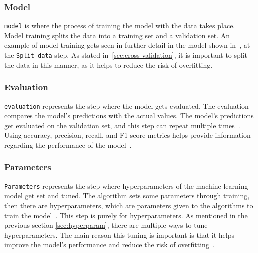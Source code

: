 \subsubsection{Model}\label{subsubsec:machine-learning-pipeline-model-training}
\texttt{model} is where the process of training the model with the data takes place. Model training splits the data into a training set and a validation set. An example of model training gets seen in further detail in the model shown in~\cite{machine-learning-pipeline-architecture}, at the \texttt{Split data} step. As stated in~\ref{sec:cross-validation}, it is important to split the data in this manner, as it helps to reduce the risk of overfitting. 

\subsubsection{Evaluation}\label{subsubsec:machine-learning-pipeline-evaluation}
\texttt{evaluation} represents the step where the model gets evaluated. The evaluation compares the model's predictions with the actual values. The model's predictions get evaluated on the validation set, and this step can repeat multiple times~\cite{machine-learning-pipeline-architecture}. Using accuracy, precision, recall, and F1 score metrics helps provide information regarding the performance of the model~\cite{performance-evaluation}.

\subsubsection{Parameters}\label{subsubsec:machine-learning-pipeline-parameters}
\texttt{Parameters} represents the step where hyperparameters of the machine learning model get set and tuned. The algorithm sets some parameters through training, then there are hyperparameters, which are parameters given to the algorithms to train the model~\cite{what-is-hyperparameter-tuning}. This step is purely for hyperparameters. As mentioned in the previous section \ref{sec:hyperparam}, there are multiple ways to tune hyperparameters. The main reason this tuning is important is that it helps improve the model's performance and reduce the risk of overfitting~\cite{hyperparameter-tuning}.






